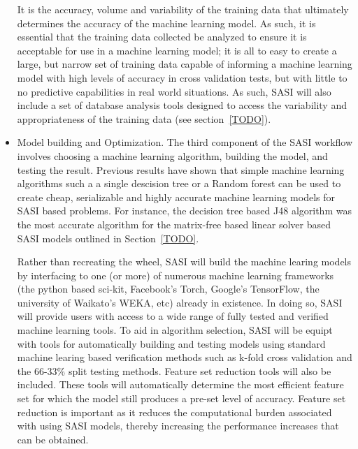 \begin{itemize}
 It is the accuracy, volume and variability of the training data that ultimately determines the accuracy of the machine learning model. As such, it is essential that the training data collected be analyzed to ensure it is acceptable for use in a machine learning model; it is all to easy to create a large, but narrow set of training data capable of informing a machine learning model with high levels of accuracy in cross validation tests, but with little to no predictive capabilities in real world situations. As such, SASI will also include a set of database analysis tools designed to access the variability and appropriateness of the training data (see section~\ref{TODO}). 
 
 \item Model building and Optimization. The third component of the SASI workflow involves choosing a machine learning algorithm, building the model, and testing the result. Previous results have shown that simple machine learning algorithms such a a single descision tree or a Random forest can be used to create cheap, serializable and highly accurate machine learning models for SASI based problems. For instance, the decision tree based J48 algorithm was the most accurate algorithm for the matrix-free based linear solver based SASI models outlined in Section~\ref{TODO}. 
 
 Rather than recreating the wheel, SASI will build the machine learing models by interfacing to one (or more) of numerous machine learning frameworks (the python based sci-kit, Facebook's Torch, Google's TensorFlow, the university of Waikato's WEKA, etc) already in existence. In doing so, SASI will provide users with access to a wide range of fully tested and verified machine learning tools. To aid in algorithm selection, SASI will be equipt with tools for automatically building and testing models using standard machine learing based verification methods such as k-fold cross validation and the 66-33\% split testing methods. Feature set reduction tools will also be included. These tools will automatically determine the most efficient feature set for which the model still produces a pre-set level of accuracy. Feature set reduction is important as it reduces the computational burden associated with using SASI models, thereby increasing the performance increases that can be obtained. 
 

\end{itemize}
